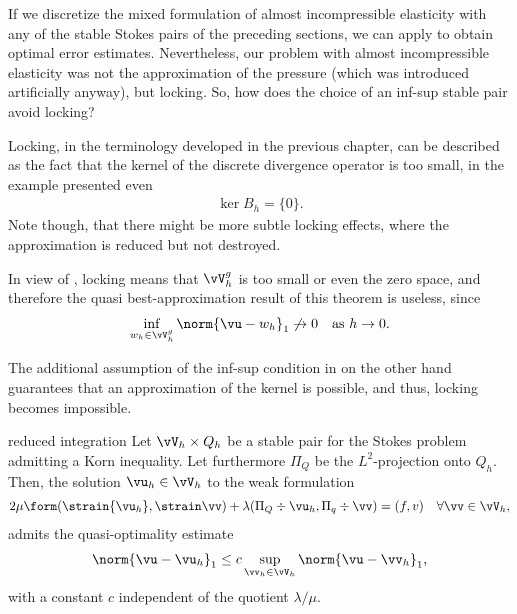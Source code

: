 \begin{intro}
  If we discretize the mixed formulation of almost incompressible
  elasticity with any of the stable Stokes pairs of the preceding
  sections, we can apply
   to obtain optimal
  error estimates. Nevertheless, our problem with almost
  incompressible elasticity was not the approximation of the pressure
  (which was introduced artificially anyway), but locking. So, how
  does the choice of an inf-sup stable pair avoid locking?
  
  Locking, in the terminology developed in the previous chapter, can
  be described as the fact that the kernel of the discrete divergence
  operator is too small, in the example presented even
  \begin{gather}
    \ker B_h = \{0\}.
  \end{gather}
  Note though, that there might be more subtle locking effects, where
  the approximation is reduced but not destroyed.

  In view of , locking means
  that $\vV_h^g$ is too small or even the zero space, and therefore the
  quasi best-approximation result of this theorem is useless, since
  \begin{gather}
    \inf_{w_h\in \vV_h^g} \norm{\vu-w_h}_{1} \not\to 0
    \quad\text{as } h \to 0.
  \end{gather}
  
  The additional assumption of the inf-sup condition
  in on the other hand guarantees
  that an approximation of the kernel is possible, and thus, locking
  becomes impossible.
\end{intro}

\begin{Lemma}{reduced integration}
  Let $\vV_h\times Q_h$ be a stable pair for the Stokes problem
  admitting a Korn inequality. Let furthermore $\Pi_Q$ be the
  $L^2$-projection onto $Q_h$. Then, the solution $\vu_h\in \vV_h$ to the
  weak formulation
  \begin{gather}
    \label{eq:stokes:33}
    2\mu \form(\strain{\vu_h},\strain \vv) + \lambda (\Pi_Q \div
    \vu_h,\Pi_q\div \vv) = (f,v)
    \quad\forall \vv\in \vV_h,
  \end{gather}
  admits the quasi-optimality estimate
  \begin{gather}
    \norm{\vu-\vu_h}_1 \le c \sup_{\vv_h\in \vV_h}\norm{\vu-\vv_h}_1,
  \end{gather}
  with a constant $c$ independent of the quotient $\lambda/\mu$.
\end{Lemma}

